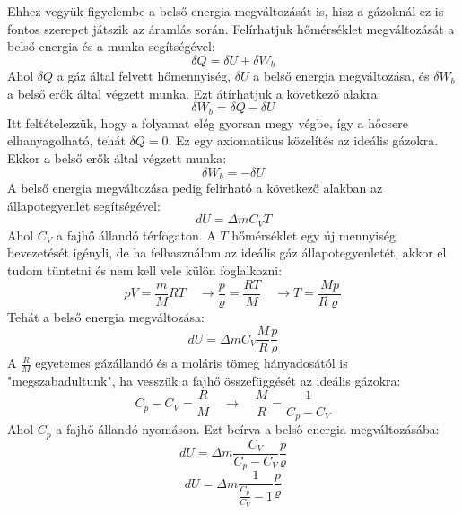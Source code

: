 \documentclass[a4paper,12pt]{article}
\begin{document}
Ehhez vegyük figyelembe a belső energia megváltozását is, hisz a gázoknál ez is fontos szerepet játszik az áramlás során.
Felírhatjuk hőmérséklet megváltozását a belső energia és a munka segítségével:
\begin{equation}
    \delta Q = \delta U + \delta W_b
\end{equation}
Ahol $\delta Q$ a gáz által felvett hőmennyiség, $\delta U$ a belső energia megváltozása, és $\delta W_b$ a belső erők által végzett munka.
Ezt átírhatjuk a következő alakra:
\begin{equation}
    \delta W_b = \delta Q - \delta U
\end{equation}
Itt feltételezzük, hogy a folyamat elég gyorsan megy végbe, így a hőcsere elhanyagolható, tehát $\delta Q = 0$. Ez egy axiomatikus közelítés az ideális gázokra.
Ekkor a belső erők által végzett munka:
\begin{equation}
    \delta W_b = - \delta U
\end{equation}
A belső energia megváltozása pedig felírható a következő alakban az állapotegyenlet segítségével:
\begin{equation}
    dU = \Delta m C_V T 
\end{equation}
Ahol $C_V$ a fajhő állandó térfogaton. A $T$ hőmérséklet egy új mennyiség bevezetését igényli, de ha felhasználom az ideális gáz állapotegyenletét,
akkor el tudom tüntetni és nem kell vele külön foglalkozni:
\begin{equation}
    pV = \frac{m}{M} RT \quad \rightarrow \frac{p}{\varrho} = \frac{RT}{M} \quad \rightarrow T = \frac{M p}{R \varrho}
\end{equation}
Tehát a belső energia megváltozása:
\begin{equation}
    dU = \Delta m C_V \frac{M}{R} \frac{p}{\varrho}
\end{equation}
A $\frac{R}{M}$ egyetemes gázállandó és a moláris tömeg hányadosától is "megszabadultunk", ha vesszük a fajhő összefüggését az ideális gázokra:
\begin{equation}
    C_p - C_V = \frac{R}{M} \quad \rightarrow \quad \frac{M}{R} = \frac{1}{C_p - C_V}
\end{equation}
Ahol $C_p$ a fajhő állandó nyomáson. Ezt beírva a belső energia megváltozásába:
\begin{equation}
    dU = \Delta m \frac{C_V}{C_p - C_V} \frac{p}{\varrho}
\end{equation}
\begin{equation}
    dU = \Delta m \frac{1}{\frac{C_p}{C_V} -1} \frac{p}{\varrho}
\end{equation}
\end{document}
